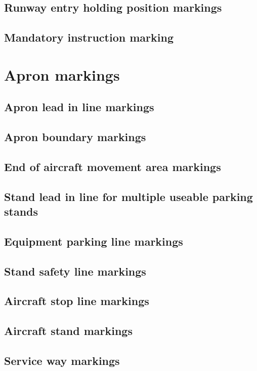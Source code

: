 		\subsection{Runway entry holding position markings}
		\subsection{Mandatory instruction marking}
	
	\section{Apron markings} %
		\subsection{Apron lead in line markings}
		\subsection{Apron boundary markings}
		\subsection{End of aircraft movement area markings}
		\subsection{Stand lead in line for multiple useable parking stands}
		\subsection{Equipment parking line markings}
		\subsection{Stand safety line markings}
		\subsection{Aircraft stop line markings}
		\subsection{Aircraft stand markings}
		\subsection{Service way markings}
		
	